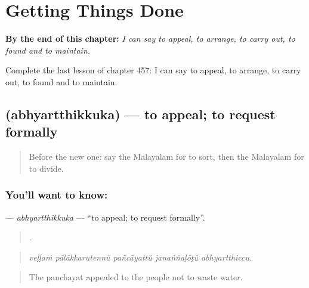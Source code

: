 
\chapter{Getting Things Done}
\label{ch:ml-getting-things-done}

\begin{chapteropening}
\textbf{By the end of this chapter:} \emph{I can say to appeal, to arrange, to carry out, to found and to maintain.}

Complete the last lesson of chapter 457: I can say to appeal, to arrange, to carry out, to found and to maintain.
\end{chapteropening}

\section[\texorpdfstring{\ml{അഭ്യർത്ഥിക്കുക} (abhyartthikkuka)}{അഭ്യർത്ഥിക്കുക (abhyartthikkuka)}]{ (abhyartthikkuka) — to appeal; to request formally}

\label{lesson:ML-C457-abhyartthikkuka}



\begin{quote}
Before the new one: say the Malayalam for to sort, then the Malayalam for to divide.
\end{quote}

\subsection*{You'll want to know: }
\textbf{} — \emph{abhyartthikkuka} — \textquotedblleft{}to appeal; to request formally\textquotedblright{}.

\begin{quote}
    .
\end{quote}

\begin{quote}
\emph{veḷḷaṁ pāḻākkarutennŭ pañcāyattŭ janaṅṅaḷōṭŭ abhyartthiccu.}
\end{quote}

\begin{quote}
The panchayat appealed to the people not to waste water.
\end{quote}

